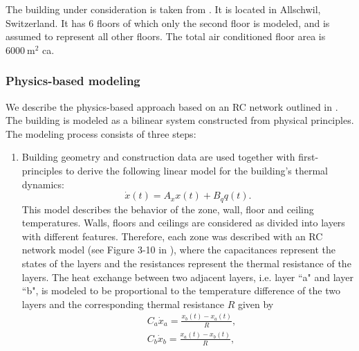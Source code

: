 \textcolor[rgb]{0,0,1}{The building under consideration is taken from \cite{Sturzenegger2016}. It is located in Allschwil, Switzerland. It has 6 floors of which only the second floor is modeled, and is assumed to represent all other floors. The total air conditioned floor area is $6000\ \mathrm{m^2}$ ca.}

\subsubsection{Physics-based modeling}
\label{SSS:physics-based}
\textcolor[rgb]{0,0,1}{We describe the physics-based approach based on an RC network outlined in \cite{Sturzenegger2016}.
The building is modeled as a bilinear system constructed from physical principles.
The modeling process consists of three steps:
\begin{enumerate}
	\item Building geometry and construction data are used together with first-principles to derive the following linear model for the building's thermal dynamics:
		\begin{equation}\label{E:RCZoneEq}
			\dot x(t) = A_x x(t) + B_q q(t).
		\end{equation}
		This model describes the behavior of the zone, wall, floor and ceiling temperatures.
		Walls, floors and ceilings are considered as divided into layers with different features. Therefore, each zone was described with an RC network model (see Figure 3-10 in \cite{SturzeneggerTR}), where the capacitances represent the states of the layers and the resistances represent the thermal resistance of the layers.
		The heat exchange between two adjacent layers, i.e. layer ``a" and layer ``b", is modeled to be proportional to the temperature difference of the two layers and the corresponding thermal resistance $R$ given by
		\begin{equation}\label{E:RCHeatExchange}
			\begin{aligned}
				&C_a\dot x_a = \frac{x_b(t) - x_a(t)}{R},\\
				&C_b\dot x_b =  \frac{x_a(t) - x_b(t)}{R},
			\end{aligned}
		\end{equation}

\end{enumerate}}
